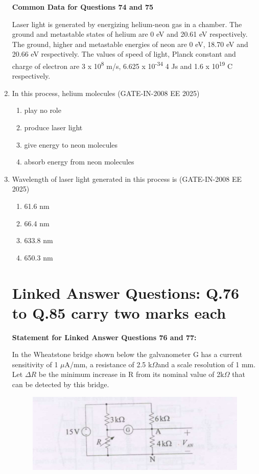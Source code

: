\documentclass[journal,12pt,onecolumn]{IEEEtran}
\theoremstyle{remark}
\begin{document}
\begin{enumerate}[label=Q.\arabic*,start=1]
\textbf{Common Data for Questions 74 and 75}

Laser light is generated by energizing helium-neon gas in a chamber. The ground and metastable states of
helium are 0 eV and 20.61 eV respectively. The ground, higher and metastable energies of neon are 0 eV,
18.70 eV and 20.66 eV respectively. The values of speed of light, Planck constant and charge of electron
are 3 x 10\textsuperscript{8}  m/s, 6.625 x 10\textsuperscript{-34} 4 Js and 1.6 x 10\textsuperscript{19} C respectively.


 \item In this process, helium molecules (GATE-IN-2008 EE 2025)
           \begin{enumerate} 
              \item  play no role        
              \item  produce laser light
              \item  give energy to neon molecules
              \item  absorb energy from neon molecules
            \end{enumerate}



\item  Wavelength of laser light generated in this process is (GATE-IN-2008 EE 2025)
           \begin{enumerate} 
              \item 61.6 nm       
              \item 66.4 nm
              \item 633.8 nm
              \item 650.3 nm
            \end{enumerate}

\section*{Linked Answer Questions: Q.76 to Q.85 carry two marks each }
\textbf{Statement for Linked Answer Questions 76 and 77:}

In the Wheatstone bridge shown below the galvanometer G has a current sensitivity of 1 $\mu$A/mm, a
resistance of 2.5 k$\Omega$and a scale resolution of 1 mm. Let $\Delta$$R$ be the minimum increase in R from its
nominal value of 2k$\Omega$ that can be detected by this bridge.

\begin{figure}[H]
    \centering
    \includegraphics[width=0.5\linewidth]{figs/i33.jpg}
    \label{fig:placeholder33}
\end{figure}


\end{enumerate}
\end{document}
